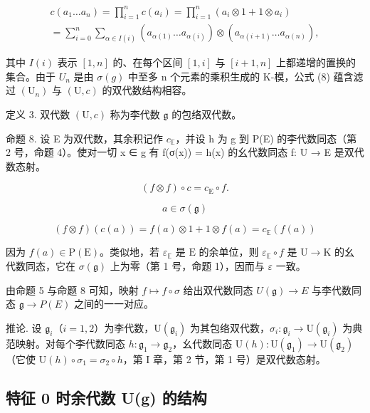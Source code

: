 \[
\begin{array}{l} c (a _ {1} \ldots a _ {n}) = \prod_ {i = 1} ^ {n} c (a _ {i}) = \prod_ {i = 1} ^ {n} (a _ {i} \otimes 1 + 1 \otimes a _ {i}) \\ = \sum_ {i = 0} ^ {n} \sum_ {\alpha \in I (i)} (a _ {\alpha (1)} \ldots a _ {\alpha (i)}) \otimes (a _ {\alpha (i + 1)} \ldots a _ {\alpha (n)}), \end{array}\tag{8}
\]

其中 \(I(i)\) 表示 \([1, n]\) 的、在每个区间 \([1, i]\) 与 \([i + 1, n]\) 上都递增的置换的集合。由于 \(U_{n}\) 是由 \(\sigma(g)\) 中至多 n 个元素的乘积生成的 K-模，公式 (8) 蕴含滤过 \((\mathrm{U}_{n})\) 与 \((\mathrm{U}, c)\) 的双代数结构相容。

定义 3. 双代数 \((\mathrm{U}, c)\) 称为李代数 \(\mathfrak{g}\) 的包络双代数。

命题 8. 设 E 为双代数，其余积记作 \(c_{\mathbb{E}}\)，并设 h 为 g 到 P(E) 的李代数同态（第 2 号，命题 4）。使对一切 x ∈ g 有 f(σ(x)) = h(x) 的幺代数同态 f: U → E 是双代数态射。

\[
(f \otimes f) \circ c = c _ {\mathrm{E}} \circ f.
\]

\[
a \in \sigma (\mathfrak {g})
\]

\[
(f \otimes f) (c (a)) = f (a) \otimes 1 + 1 \otimes f (a) = c _ {\mathbb {E}} (f (a))
\]

因为 \(f(a) \in \mathrm{P}(\mathrm{E})\)。类似地，若 \(\varepsilon_{\mathbb{E}}\) 是 \(\mathrm{E}\) 的余单位，则 \(\varepsilon_{\mathbb{E}} \circ f\) 是 \(\mathrm{U} \to \mathrm{K}\) 的幺代数同态，它在 \(\sigma(\mathfrak{g})\) 上为零（第 1 号，命题 1），因而与 \(\varepsilon\) 一致。

由命题 5 与命题 8 可知，映射 \(f \mapsto f \circ \sigma\) 给出双代数同态 \(U(\mathfrak{g}) \to E\) 与李代数同态 \(\mathfrak{g} \to P(E)\) 之间的一一对应。

推论. 设 \(\mathfrak{g}_i\)（\(i = 1,2\)）为李代数，\(\mathrm{U}(\mathfrak{g}_i)\) 为其包络双代数，\(\sigma_i\colon \mathfrak{g}_i\to \mathrm{U}(\mathfrak{g}_i)\) 为典范映射。对每个李代数同态 \(h\colon \mathfrak{g}_1\to \mathfrak{g}_2\)，幺代数同态 \(\mathrm{U}(h)\colon \mathrm{U}(\mathfrak{g}_1)\to \mathrm{U}(\mathfrak{g}_2)\)（它使 \(\mathrm{U}(h)\circ \sigma_1 = \sigma_2\circ h\)，第 I 章，第 2 节，第 1 号）是双代数态射。

\subsection{特征 0 时余代数 U(g) 的结构}

